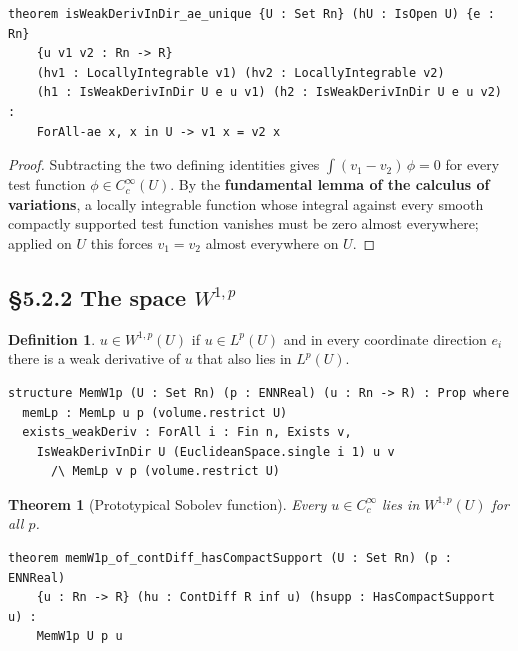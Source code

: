 ﻿\documentclass[12pt, a4paper]{article}
\renewcommand{\_}{\origunderscore\allowbreak}
\theoremstyle{definition}
\newtheorem{definition}{Definition}[section]
\theoremstyle{plain}
\newtheorem{theorem}{Theorem}[section]
\begin{document}
\begin{lstlisting}[caption={Weak derivative unique a.e. (proved)}]
theorem isWeakDerivInDir_ae_unique {U : Set Rn} (hU : IsOpen U) {e : Rn}
    {u v1 v2 : Rn -> R}
    (hv1 : LocallyIntegrable v1) (hv2 : LocallyIntegrable v2)
    (h1 : IsWeakDerivInDir U e u v1) (h2 : IsWeakDerivInDir U e u v2) :
    ForAll-ae x, x in U -> v1 x = v2 x
\end{lstlisting}

\begin{proof}
Subtracting the two defining identities gives $\int (v_1-v_2)\,\phi=0$ for every test
function $\phi\in C^\infty_c(U)$. By the \textbf{fundamental lemma of the calculus of
variations}, a locally integrable function whose integral against every smooth compactly
supported test function vanishes must be zero almost everywhere; applied on $U$ this forces
$v_1=v_2$ almost everywhere on $U$.
\end{proof}

\subsection{§5.2.2 The space $W^{1,p}$}

\begin{definition}
$u \in W^{1,p}(U)$ if $u \in L^p(U)$ and in every coordinate direction $e_i$ there
is a weak derivative of $u$ that also lies in $L^p(U)$.
\end{definition}

\begin{lstlisting}[caption={Membership in W^{1,p}}]
structure MemW1p (U : Set Rn) (p : ENNReal) (u : Rn -> R) : Prop where
  memLp : MemLp u p (volume.restrict U)
  exists_weakDeriv : ForAll i : Fin n, Exists v,
    IsWeakDerivInDir U (EuclideanSpace.single i 1) u v
      /\ MemLp v p (volume.restrict U)
\end{lstlisting}

\begin{theorem}[Prototypical Sobolev function]
Every $u \in C^\infty_c$ lies in $W^{1,p}(U)$ for all $p$.
\end{theorem}

\begin{lstlisting}[caption={Smooth compact support implies W^{1,p} (proved)}]
theorem memW1p_of_contDiff_hasCompactSupport (U : Set Rn) (p : ENNReal)
    {u : Rn -> R} (hu : ContDiff R inf u) (hsupp : HasCompactSupport u) :
    MemW1p U p u
\end{lstlisting}
\end{document}
